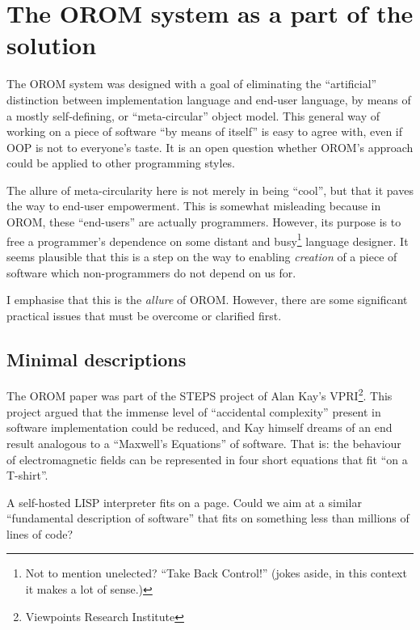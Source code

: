 \hypertarget{the-orom-system-as-a-part-of-the-solution}{%
\section{The OROM system as a part of the
solution}\label{the-orom-system-as-a-part-of-the-solution}}

The OROM system was designed with a goal of eliminating the
``artificial'' distinction between implementation language and end-user
language, by means of a mostly self-defining, or ``meta-circular''
object model. This general way of working on a piece of software ``by
means of itself'' is easy to agree with, even if OOP is not to
everyone's taste. It is an open question whether OROM's approach could
be applied to other programming styles.

The allure of meta-circularity here is not merely in being ``cool'', but
that it paves the way to end-user empowerment. This is somewhat
misleading because in OROM, these ``end-users'' are actually
programmers. However, its purpose is to free a programmer's dependence
on some distant and busy\footnote{Not to mention unelected? ``Take Back
  Control!'' (jokes aside, in this context it makes a lot of sense.)}
language designer. It seems plausible that this is a step on the way to
enabling \emph{creation} of a piece of software which non-programmers do
not depend on us for.

I emphasise that this is the \emph{allure} of OROM. However, there are
some significant practical issues that must be overcome or clarified
first.

\hypertarget{minimal-descriptions}{%
\subsection{Minimal descriptions}\label{minimal-descriptions}}

The OROM paper was part of the STEPS project of Alan Kay's
VPRI\footnote{Viewpoints Research Institute}. This project argued that
the immense level of ``accidental complexity'' present in software
implementation could be reduced, and Kay himself dreams of an end result
analogous to a ``Maxwell's Equations'' of software. That is: the
behaviour of electromagnetic fields can be represented in four short
equations that fit ``on a T-shirt''.

A self-hosted LISP interpreter fits on a page. Could we aim at a similar
``fundamental description of software'' that fits on something less than
millions of lines of code?

